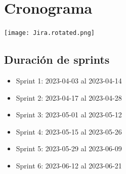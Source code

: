 \documentclass{article}
\begin{document}
\section{Cronograma}
\centering
\texttt{[image: Jira.rotated.png]}

\newpage
\subsection{Duración de sprints}

\begin{itemize}
	\item Sprint 1: 2023-04-03 al 2023-04-14
	\item Sprint 2: 2023-04-17 al 2023-04-28
	\item Sprint 3: 2023-05-01 al 2023-05-12
	\item Sprint 4: 2023-05-15 al 2023-05-26
	\item Sprint 5: 2023-05-29 al 2023-06-09
	\item Sprint 6: 2023-06-12 al 2023-06-21
\end{itemize}
\end{document}
